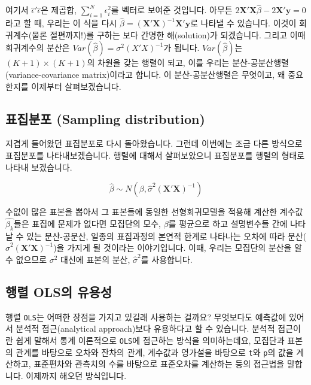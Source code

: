 \documentclass[
]{book}
\begin{document}
여기서 \(\hat{\epsilon}'\hat{\epsilon}\)은 제곱합, \(\sum^{N}_{i=1}\epsilon^{2}_{i}\)를 벡터로 보여준 것입니다. 아무튼 \(2\textbf{X}'\textbf{X}\hat{\beta}-2\textbf{X}'\textbf{y} = 0\)라고 할 때, 우리는 이 식을 다시 \(\hat{\beta} = (\textbf{X}'\textbf{X})^{-1}\textbf{X}'\textbf{y}\)로 나타낼 수 있습니다. 이것이 회귀계수(물론 절편까지!)를 구하는 보다 간명한 해(solution)가 되겠습니다. 그리고 이때 회귀계수의 분산은 \(Var(\hat{\beta}) = \sigma^2(X'X)^{-1}\)가 됩니다. \(Var(\hat{\beta})\)는 \((K+1)\times(K+1)\)의 차원을 갖는 행렬이 되고, 이를 우리는 분산-공분산행렬(variance-covariance matrix)이라고 합니다. 이 분산-공분산행렬은 무엇이고, 왜 중요한지를 이제부터 살펴보겠습니다.

\hypertarget{uxd45cuxc9d1uxbd84uxd3ec-sampling-distribution}{%
\subsection{표집분포 (Sampling distribution)}\label{uxd45cuxc9d1uxbd84uxd3ec-sampling-distribution}}

지겹게 들어왔던 표집분포로 다시 돌아왔습니다. 그런데 이번에는 조금 다른 방식으로 표집분포를 나타내보겠습니다. 행렬에 대해서 살펴보았으니 표집분포를 행렬의 형태로 나타내 보겠습니다.

\[
\hat{\beta}\sim N(\beta, \hat{\sigma}^2(\textbf{X}'\textbf{X})^{-1})
\]

수없이 많은 표본을 뽑아서 그 표본들에 동일한 선형회귀모델을 적용해 계산한 계수값 \(\hat{\beta_k}\)들은 표집에 문제가 없다면 모집단의 모수, \(\beta\)를 평균으로 하고 설명변수들 간에 나타날 수 있는 분산-공분산, 일종의 표집과정의 본연적 한계로 나타나는 오차에 따라 분산(\(\hat{\sigma}^2(\textbf{X}'\textbf{X})^{-1}\))을 가지게 될 것이라는 이야기입니다. 이때, 우리는 모집단의 분산을 알 수 없으므로 \(\sigma^2\) 대신에 표본의 분산, \(\hat{\sigma}^2\)를 사용합니다.

\hypertarget{uxd589uxb82c-olsuxc758-uxc720uxc6a9uxc131}{%
\subsection{행렬 OLS의 유용성}\label{uxd589uxb82c-olsuxc758-uxc720uxc6a9uxc131}}

행렬 \texttt{OLS}는 어떠한 장점을 가지고 있길래 사용하는 걸까요? 무엇보다도 예측값에 있어서 분석적 접근(analytical approach)보다 유용하다고 할 수 있습니다. 분석적 접근이란 쉽게 말해서 통계 이론적으로 \texttt{OLS}에 접근하는 방식을 의미하는데요, 모집단과 표본의 관계를 바탕으로 오차와 잔차의 관계, 계수값과 영가설을 바탕으로 \texttt{t}와 \texttt{p}의 값을 계산하고, 표준편차와 관측치의 수를 바탕으로 표준오차를 계산하는 등의 접근법을 말합니다. 이제까지 해오던 방식입니다.
\end{document}
